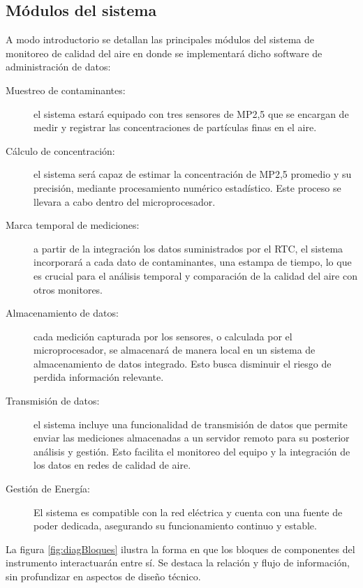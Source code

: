 \documentclass[
11pt, %
codirector, %
]{charter}
\begin{document}
	


\subsection{Módulos del sistema}

A modo introductorio se detallan las principales módulos del sistema de monitoreo de calidad del aire en donde se implementará dicho software de administración de datos:

\begin{description}
	\item[Muestreo de contaminantes:] el sistema estará equipado con tres sensores de MP2,5 que se encargan de medir y registrar las concentraciones de partículas finas en el aire.
	
	\item[Cálculo de concentración:] el sistema será capaz de estimar la concentración de MP2,5 promedio y su precisión, mediante procesamiento numérico estadístico. Este proceso se llevara a cabo dentro del microprocesador.
	
	\item[Marca temporal de mediciones:] a partir de la integración los datos suministrados por el RTC, el sistema incorporará a cada dato de contaminantes, una estampa de tiempo, lo que es crucial para el análisis temporal y comparación de la calidad del aire con otros monitores.
	
	\item[Almacenamiento de datos:] cada medición capturada por los sensores, o calculada por el microprocesador, se almacenará de manera local en un sistema de almacenamiento de datos integrado. Esto busca disminuir el riesgo de perdida información relevante.
	
	\item[Transmisión de datos:] el sistema incluye una funcionalidad de transmisión de datos que permite enviar las mediciones almacenadas a un servidor remoto para su posterior análisis y gestión. Esto facilita el monitoreo del equipo y la integración de los datos en redes de calidad de aire.
	
	\item[Gestión de Energía:] El sistema es compatible con la red eléctrica y cuenta con una fuente de poder dedicada, asegurando su funcionamiento continuo y estable.
	
\end{description}

La figura \ref{fig:diagBloques} ilustra la forma en que los bloques de componentes del instrumento interactuarán entre sí. Se destaca la relación y flujo de información, sin profundizar en aspectos de diseño técnico.
\end{document}
